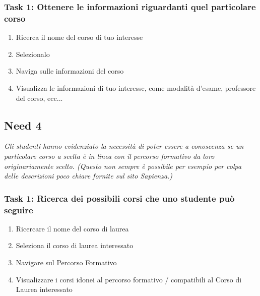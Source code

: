 \subsubsection{Task 1: Ottenere le informazioni riguardanti quel particolare corso}
\begin{enumerate}
    \item Ricerca il nome del corso di tuo interesse
    \item Selezionalo
    \item Naviga sulle informazioni del corso
    \item Visualizza le informazioni di tuo interesse, come modalità d’esame, professore del corso, ecc...
\end{enumerate}


\subsection{Need 4}
\begin{center}
    \textit{Gli studenti hanno evidenziato la necessità di poter essere a conoscenza se un particolare corso a scelta è in linea con il percorso formativo da loro originariamente scelto. (Questo non sempre è possibile per esempio per colpa delle descrizioni poco chiare fornite sul sito Sapienza.)    }
\end{center}
\subsubsection{Task 1: Ricerca dei possibili corsi che uno studente può seguire}
\begin{enumerate}
    \item Ricercare il nome del corso di laurea
    \item Seleziona il corso di laurea interessato
    \item Navigare sul Percorso Formativo 
    \item Visualizzare i corsi idonei al percorso formativo / compatibili al Corso di Laurea interessato 
\end{enumerate}

